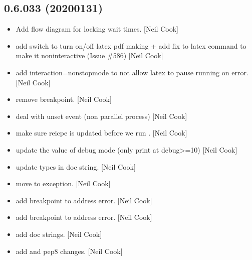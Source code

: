 \documentclass[a4paper,10pt,english]{report}
\begin{document}
\subsection{0.6.033 (2020\sphinxhyphen{}01\sphinxhyphen{}31)}
\label{\detokenize{misc/changelog:id4}}\begin{itemize}
\item {} 
Add flow diagram for locking wait times. {[}Neil Cook{]}

\item {} 
 \sphinxhyphen{} add switch to turn on/off latex pdf making + add
fix to latex command to make it non\sphinxhyphen{}interactive (Issue \#586) {[}Neil
Cook{]}

\item {} 
 \sphinxhyphen{} add \sphinxhyphen{}interaction=nonstopmode to not allow latex
to pause running on error. {[}Neil Cook{]}

\item {} 
 \sphinxhyphen{} remove breakpoint. {[}Neil Cook{]}

\item {} 
 \sphinxhyphen{} deal with unset event (non\sphinxhyphen{}
parallel process) {[}Neil Cook{]}

\item {} 
 \sphinxhyphen{} make sure reicpe is updated before we run
. {[}Neil Cook{]}

\item {} 
 \sphinxhyphen{} update the value of debug
mode (only print at debug\textgreater{}=10) {[}Neil Cook{]}

\item {} 
 \sphinxhyphen{} update types in doc string.
{[}Neil Cook{]}

\item {} 
 \sphinxhyphen{} move  to exception. {[}Neil Cook{]}

\item {} 
 \sphinxhyphen{} add breakpoint to address error. {[}Neil Cook{]}

\item {} 
 \sphinxhyphen{} add breakpoint to address error. {[}Neil Cook{]}

\item {} 
 \sphinxhyphen{} add doc strings. {[}Neil Cook{]}

\item {} 
 \sphinxhyphen{} add  and pep8 changes. {[}Neil
Cook{]}

\end{itemize}
\end{document}
